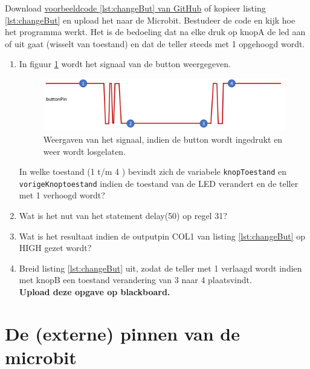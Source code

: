 Download    \href{https://github.com/JohnVi-hhs/embsysP/tree/main/voorbeelden/veranderToestandDrukknop.ino}{voorbeeldcode \ref{lst:changeBut} van GitHub} of kopieer listing \ref{lst:changeBut} en upload het naar de Microbit.
Bestudeer de code en kijk hoe het programma werkt. Het is de bedoeling dat na elke druk op knopA de led aan of uit gaat (wisselt van toestand) en dat de teller steeds met 1 opgehoogd wordt. 
\begin{enumerate}[label=(\Alph*)]
	
	\item In figuur \ref{fig:swToestand} wordt het signaal van de button weergegeven.
	\begin{figure}[h!]
		\captionsetup{justification=centering}
		\includegraphics[width=0.8 \linewidth]{figuren/toestandButtonPin}
		\centering
		\caption{Weergaven van het signaal, indien de button wordt ingedrukt en weer wordt losgelaten.}
		\label{fig:swToestand}
	\end{figure}
	In welke toestand (1 t/m 4 )  bevindt zich de variabele \texttt{knopToestand} en \texttt{vorigeKnoptoestand} indien de toestand van de LED verandert en de teller met 1 verhoogd wordt?
	\item Wat is het nut van het statement \textcolor{arduinoOrange}{delay}(50) op regel 31?\hrulefill
	\item Wat is het resultaat indien de outputpin COL1 van listing \ref{lst:changeBut} op \textcolor{arduinoBlue}{HIGH} gezet wordt?	
	\item Breid listing \ref{lst:changeBut} uit, zodat de teller met 1 verlaagd wordt indien met knopB een toestand verandering van 3 naar 4 plaatsvindt.\\
	\textbf{Upload deze opgave op blackboard.}
	
\end{enumerate}

\section{De (externe) pinnen van de microbit}

